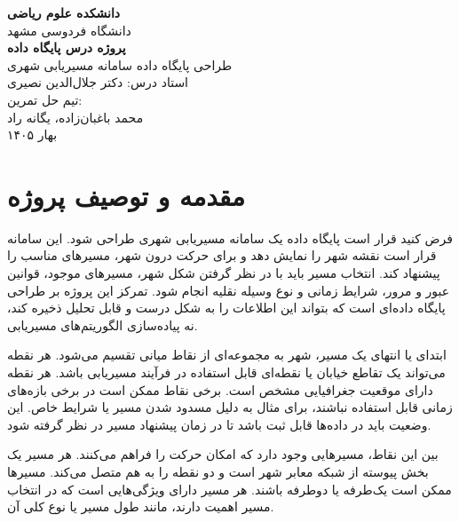 \documentclass[12pt,a4paper]{article}
\begin{document}
\begin{titlepage}
\begin{center}
\vspace*{1.5cm}
{\huge\bfseries دانشکده علوم ریاضی} \\
\vspace{0.3cm}
{\Large دانشگاه فردوسی مشهد} \\
\vspace{2.5cm}
{\Huge\bfseries پروژه درس پایگاه داده} \\
\vspace{0.5cm}
{\Large طراحی پایگاه داده سامانه مسیریابی شهری} \\
\vspace{3.5cm}
{\Large استاد درس: دکتر جلال‌الدین نصیری} \\
\vspace{1.5cm}
{\large تیم حل تمرین:} \\
\vspace{0.3cm}
{\large محمد باغبان‌زاده، یگانه راد} \\
\vspace{3.5cm}
{\large بهار ۱۴۰۵}
\end{center}
\end{titlepage}

\newpage
\tableofcontents
\newpage

\section{مقدمه و توصیف پروژه}
فرض کنید قرار است پایگاه داده یک سامانه مسیریابی شهری طراحی شود. این سامانه قرار است نقشه شهر را نمایش دهد و برای حرکت درون شهر، مسیرهای مناسب را پیشنهاد کند. انتخاب مسیر باید با در نظر گرفتن شکل شهر، مسیرهای موجود، قوانین عبور و مرور، شرایط زمانی و نوع وسیله نقلیه انجام شود. تمرکز این پروژه بر طراحی پایگاه داده‌ای است که بتواند این اطلاعات را به شکل درست و قابل تحلیل ذخیره کند، نه پیاده‌سازی الگوریتم‌های مسیریابی.

ابتدای یا انتهای یک مسیر، شهر به مجموعه‌ای از نقاط میانی تقسیم می‌شود. هر نقطه می‌تواند یک تقاطع خیابان یا نقطه‌ای قابل استفاده در فرآیند مسیریابی باشد. هر نقطه دارای موقعیت جغرافیایی مشخص است. برخی نقاط ممکن است در برخی بازه‌های زمانی قابل استفاده نباشند، برای مثال به دلیل مسدود شدن مسیر یا شرایط خاص. این وضعیت باید در داده‌ها قابل ثبت باشد تا در زمان پیشنهاد مسیر در نظر گرفته شود.

بین این نقاط، مسیرهایی وجود دارد که امکان حرکت را فراهم می‌کنند. هر مسیر یک بخش پیوسته از شبکه معابر شهر است و دو نقطه را به هم متصل می‌کند. مسیرها ممکن است یک‌طرفه یا دوطرفه باشند. هر مسیر دارای ویژگی‌هایی است که در انتخاب مسیر اهمیت دارند، مانند طول مسیر یا نوع کلی آن.
\end{document}
